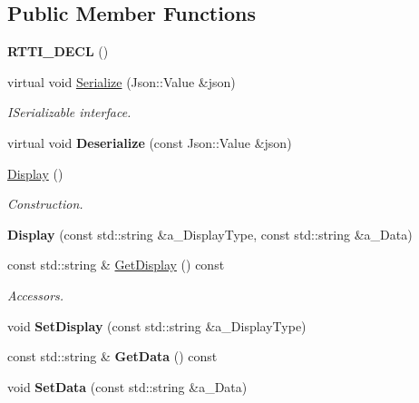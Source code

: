 \subsection*{Public Member Functions}
\begin{DoxyCompactItemize}
\item 
\mbox{\label{class_display_ac381760387be9c662b29efa120be2232}} 
{\bfseries R\+T\+T\+I\+\_\+\+D\+E\+CL} ()
\item 
\mbox{\label{class_display_abe3f2917dc53984aed26ce3fde15d82f}} 
virtual void \hyperlink{class_display_abe3f2917dc53984aed26ce3fde15d82f}{Serialize} (Json\+::\+Value \&json)
\begin{DoxyCompactList}\small\item\em I\+Serializable interface. \end{DoxyCompactList}\item 
\mbox{\label{class_display_a5f74bc892861390b9453e9fdd49920ab}} 
virtual void {\bfseries Deserialize} (const Json\+::\+Value \&json)
\item 
\mbox{\label{class_display_ae972fffea6f7ca1d627ef48c3d841bb3}} 
\hyperlink{class_display_ae972fffea6f7ca1d627ef48c3d841bb3}{Display} ()
\begin{DoxyCompactList}\small\item\em Construction. \end{DoxyCompactList}\item 
\mbox{\label{class_display_aa39c7a9b32afa85e78a302ef37d4b0da}} 
{\bfseries Display} (const std\+::string \&a\+\_\+\+Display\+Type, const std\+::string \&a\+\_\+\+Data)
\item 
\mbox{\label{class_display_ad74675a76e48a7641883ab5174e4f0ba}} 
const std\+::string \& \hyperlink{class_display_ad74675a76e48a7641883ab5174e4f0ba}{Get\+Display} () const
\begin{DoxyCompactList}\small\item\em Accessors. \end{DoxyCompactList}\item 
\mbox{\label{class_display_a123014b3e7fedeb5bba3dc9cc9ebee75}} 
void {\bfseries Set\+Display} (const std\+::string \&a\+\_\+\+Display\+Type)
\item 
\mbox{\label{class_display_af8d0f143fba382ceefeaa4413cd32c95}} 
const std\+::string \& {\bfseries Get\+Data} () const
\item 
\mbox{\label{class_display_ad664fc5ec24557a46097e1e893499985}} 
void {\bfseries Set\+Data} (const std\+::string \&a\+\_\+\+Data)
\end{DoxyCompactItemize}
